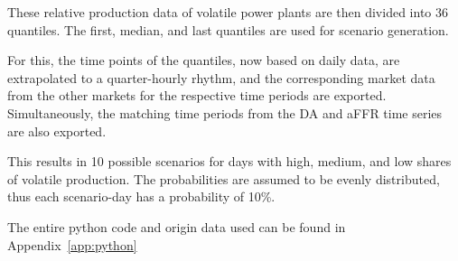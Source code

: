 These relative production data of volatile power plants are then divided into 36 quantiles.
The first, median, and last quantiles are used for scenario generation.

For this, the time points of the quantiles, now based on daily data, are extrapolated to a quarter-hourly rhythm,
and the corresponding market data from the other markets for the respective time periods are exported.
Simultaneously, the matching time periods from the DA and aFFR time series are also exported.

This results in 10 possible scenarios for days with high, medium, and low shares of volatile production.
The probabilities are assumed to be evenly distributed, thus each scenario-day has a probability of 10\%.


The entire python code and origin data used can be found in Appendix~\ref{app:python}

